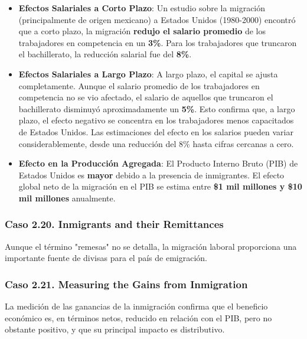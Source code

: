 \begin{itemize}
    \item \textbf{Efectos Salariales a Corto Plazo}: Un estudio sobre la migración (principalmente de origen mexicano) a Estados Unidos (1980-2000) encontró que a corto plazo, la migración \textbf{redujo el salario promedio} de los trabajadores en competencia en un \textbf{3\%}. Para los trabajadores que truncaron el bachillerato, la reducción salarial fue del \textbf{8\%}.
    \item \textbf{Efectos Salariales a Largo Plazo}: A largo plazo, el capital se ajusta completamente. Aunque el salario promedio de los trabajadores en competencia no se vio afectado, el salario de aquellos que truncaron el bachillerato disminuyó aproximadamente un \textbf{5\%}. Esto confirma que, a largo plazo, el efecto negativo se concentra en los trabajadores menos capacitados de Estados Unidos. Las estimaciones del efecto en los salarios pueden variar considerablemente, desde una reducción del 8\% hasta cifras cercanas a cero.
    \item \textbf{Efecto en la Producción Agregada}: El Producto Interno Bruto (PIB) de Estados Unidos es \textbf{mayor} debido a la presencia de inmigrantes. El efecto global neto de la migración en el PIB se estima entre \textbf{\$1 mil millones y \$10 mil millones} anualmente.
\end{itemize}

\subsubsection{Caso 2.20. Inmigrants and their Remittances}
Aunque el término "remesas" no se detalla, la migración laboral proporciona una importante fuente de divisas para el país de emigración.

\subsubsection{Caso 2.21. Measuring the Gains from Inmigration}
La medición de las ganancias de la inmigración confirma que el beneficio económico es, en términos netos, reducido en relación con el PIB, pero no obstante positivo, y que su principal impacto es distributivo.

